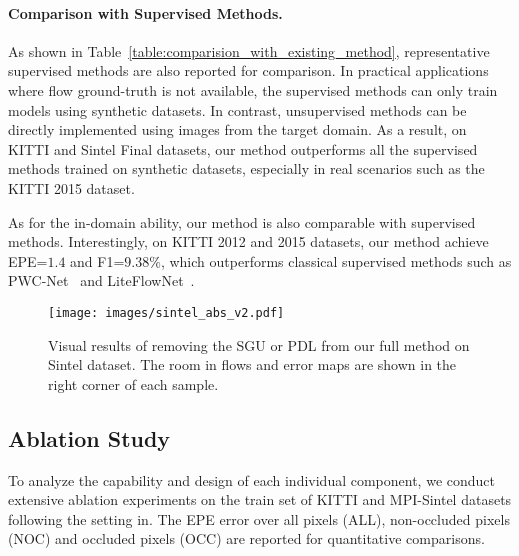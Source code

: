 \documentclass[final]{cvpr}
\begin{document}
\paragraph{Comparison with Supervised Methods. }
As shown in Table~\ref{table:comparision_with_existing_method}, representative supervised methods are also reported for comparison. 
In practical applications where flow ground-truth is not available, the supervised methods can only train models using synthetic datasets. In contrast, unsupervised methods can be directly implemented using images from the target domain. As a result, on KITTI and Sintel Final datasets, our method outperforms all the supervised methods trained on synthetic datasets, especially in real scenarios such as the KITTI 2015 dataset. 

As for the in-domain ability, our method is also comparable with supervised methods. Interestingly, on KITTI 2012 and 2015 datasets, our method achieve EPE=$1.4$ and F1=$9.38\%$, which outperforms classical supervised methods such as PWC-Net~\cite{pwc_net} and LiteFlowNet~\cite{LiteFlowNet}.

\begin{figure*}
	\centering
	\texttt{[image: images/sintel\_abs\_v2.pdf]}
	\caption{Visual results of removing the SGU or PDL from our full method on Sintel dataset. The room in flows and error maps are shown in the right corner of each sample.  
	}\label{fig:ablation_sgu_and_pdl}
\end{figure*}


\subsection{Ablation Study}\label{sec:Ablation Study}
To analyze the capability and design of each individual component, we conduct extensive ablation experiments on the train set of KITTI and MPI-Sintel datasets following the setting in\cite{Liu2019CVPR,simFlow2020eccv}. The EPE error over all pixels (ALL), non-occluded pixels (NOC) and occluded pixels (OCC) are reported for quantitative comparisons.
\vspace{-10pt} 
\end{document}
